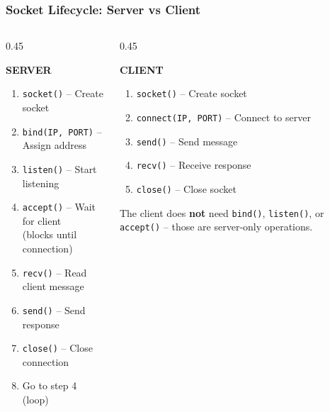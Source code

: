 \documentclass[xcolor=table]{beamer}
\begin{document}
\begin{frame}[fragile]
\frametitle{Socket Lifecycle: Server vs Client}

\begingroup\small
\begin{columns}[T]

\begin{column}{0.45\textwidth}
\begin{center}
\textbf{SERVER}
\end{center}

\vspace{0.1cm}

\begin{enumerate}
\item \texttt{socket()} -- Create socket
\item \texttt{bind(IP, PORT)} -- Assign address
\item \texttt{listen()} -- Start listening
\item \texttt{accept()} -- Wait for client \\ {\scriptsize (blocks until connection)}
\item \texttt{recv()} -- Read client message
\item \texttt{send()} -- Send response
\item \texttt{close()} -- Close connection
\item Go to step 4 (loop)
\end{enumerate}
\end{column}

\begin{column}{0.45\textwidth}
\begin{center}
\textbf{CLIENT}
\end{center}

\vspace{0.1cm}

\begin{enumerate}
\item \texttt{socket()} -- Create socket
\item \texttt{connect(IP, PORT)} -- Connect to server
\item \texttt{send()} -- Send message
\item \texttt{recv()} -- Receive response
\item \texttt{close()} -- Close socket
\end{enumerate}

\vspace{0.3cm}

{\scriptsize The client does \textbf{not} need \texttt{bind()}, \texttt{listen()}, or \texttt{accept()} -- those are server-only operations.}
\end{column}

\end{columns}
\endgroup

\end{frame}
\end{document}
